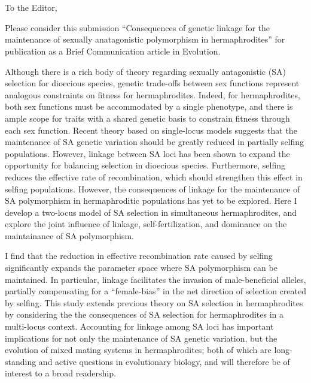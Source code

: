\documentclass[11pt]{article}
\begin{document}




\section*{}
\noindent To the Editor,
\bigskip

Please consider this submission “Consequences of genetic linkage for the maintenance of sexually anatagonistic polymorphism in hermaphrodites” for publication as a Brief Communication article in Evolution.
\bigskip

Although there is a rich body of theory regarding sexually antagonistic (SA) selection for dioecious species, genetic trade-offs between sex functions represent analogous constraints on fitness for hermaphrodites. Indeed, for hermaphrodites, both sex functions must be accommodated by a single phenotype, and there is ample scope for traits with a shared genetic basis to constrain fitness through each sex function. Recent theory based on single-locus models suggests that the maintenance of SA genetic variation should be greatly reduced in partially selfing populations. However, linkage between SA loci has been shown to expand the opportunity for balancing selection in dioecious species. Furthermore, selfing reduces the effective rate of recombination, which should strengthen this effect in selfing populations. However, the consequences of linkage for the maintenance of SA polymorphism in hermaphroditic populations has yet to be explored. Here I develop a two-locus model of SA selection in simultaneous hermaphrodites, and explore the joint influence of linkage, self-fertilization, and dominance on the maintainance of SA polymorphism. 
\bigskip

I find that the reduction in effective recombination rate caused by selfing significantly expands the parameter space where SA polymorphism can be maintained. In particular, linkage facilitates the invasion of male-beneficial alleles, partially compensating for a ``female-bias'' in the net direction of selection created by selfing. This study extends previous theory on SA selection in hermaphrodites by considering the the consequences of SA selection for hermaphrodites in a multi-locus context. Accounting for linkage among SA loci has important implications for not only the maintenance of SA genetic variation, but the evolution of mixed mating systems in hermaphrodites; both of which are long-standing and active questions in evolutionary biology, and will therefore be of interest to a broad readership.
\bigskip
\end{document}
